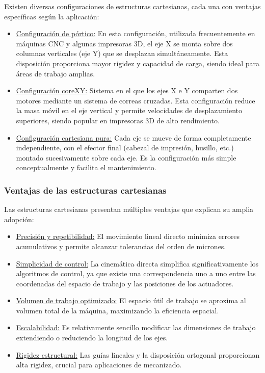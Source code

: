 Existen diversas configuraciones de estructuras cartesianas, cada una con ventajas específicas según la aplicación:
\begin{itemize}[label=$\bullet$]
    \item \underline{Configuración de pórtico:} En esta configuración, utilizada frecuentemente en máquinas CNC y algunas impresoras 3D, el eje X se monta sobre dos columnas verticales (eje Y) que se desplazan simultáneamente. Esta disposición proporciona mayor rigidez y capacidad de carga, siendo ideal para áreas de trabajo amplias.
    \item \underline{Configuración coreXY:} Sistema en el que los ejes X e Y comparten dos motores mediante un sistema de correas cruzadas. Esta configuración reduce la masa móvil en el eje vertical y permite velocidades de desplazamiento superiores, siendo popular en impresoras 3D de alto rendimiento.
    \item \underline{Configuración cartesiana pura:} Cada eje se mueve de forma completamente independiente, con el efector final (cabezal de impresión, husillo, etc.) montado sucesivamente sobre cada eje. Es la configuración más simple conceptualmente y facilita el mantenimiento.
\end{itemize}

\subsubsection{Ventajas de las estructuras cartesianas}

Las estructuras cartesianas presentan múltiples ventajas que explican su amplia adopción:

\begin{itemize}[label=$\bullet$]
    \item \underline{Precisión y repetibilidad:} El movimiento lineal directo minimiza errores acumulativos y permite alcanzar tolerancias del orden de micrones.

    \item \underline{Simplicidad de control:} La cinemática directa simplifica significativamente los algoritmos de control, ya que existe una correspondencia uno a uno entre las coordenadas del espacio de trabajo y las posiciones de los actuadores.

    \item \underline{Volumen de trabajo optimizado:} El espacio útil de trabajo se aproxima al volumen total de la máquina, maximizando la eficiencia espacial.

    \item \underline{Escalabilidad:} Es relativamente sencillo modificar las dimensiones de trabajo extendiendo o reduciendo la longitud de los ejes.

    \item \underline{Rigidez estructural:} Las guías lineales y la disposición ortogonal proporcionan alta rigidez, crucial para aplicaciones de mecanizado.
\end{itemize}

